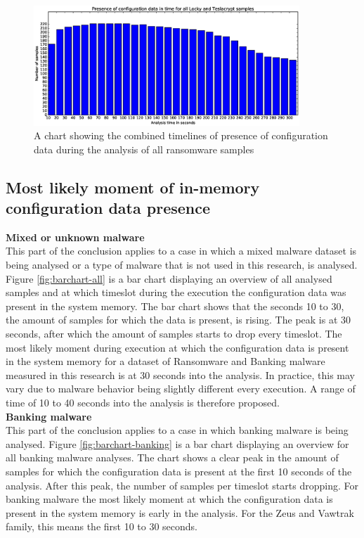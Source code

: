 \documentclass[conference]{IEEEtran}
\begin{document}
\begin{figure}[!h]
    \includegraphics[width=10cm,scale=0.5]{images/final/ransomware-barchart.eps}
    \caption{A chart showing the combined timelines of presence of configuration data during the analysis of all ransomware samples}
    \label{fig:barchart-ransom}
\end{figure}

\newpage

\subsection{Most likely moment of in-memory configuration data presence}

\textbf{Mixed or unknown malware}\\
This part of the conclusion applies to a case in which a mixed malware dataset is being analysed or a type of malware that is not used in this research, is analysed. Figure \ref{fig:barchart-all} is a bar chart displaying an overview of all analysed samples and at which timeslot during the execution the \Gls{configuration data} was present in the system memory. The bar chart shows that the seconds 10 to 30, the amount of samples for which the data is present, is rising. The peak is at 30 seconds, after which the amount of samples starts to drop every timeslot. The most likely moment during execution at which the \Gls{configuration data} is present in the system memory for a dataset of Ransomware and Banking malware measured in this research is at 30 seconds into the analysis. In practice, this may vary due to malware behavior being slightly different every execution. A range of time of 10 to 40 seconds into the analysis is therefore proposed.\\

\textbf{Banking malware}\\
This part of the conclusion applies to a case in which banking malware is being analysed. Figure \ref{fig:barchart-banking} is a bar chart displaying an overview for all banking malware analyses. The chart shows a clear peak in the amount of samples for which the \Gls{configuration data} is present at the first 10 seconds of the analysis. After this peak, the number of samples per timeslot starts dropping. For banking malware the most likely moment at which the \Gls{configuration data} is present in the system memory is early in the analysis. For the Zeus and Vawtrak family, this means the first 10 to 30 seconds.\\
\end{document}

